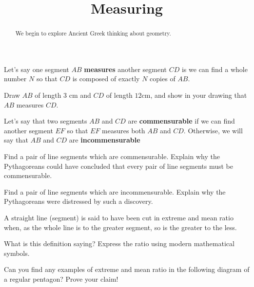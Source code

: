 \documentclass[nooutcomes]{ximera}
\title{Measuring}
\begin{document}
\begin{abstract}
    We begin to explore Ancient Greek thinking about geometry.
\end{abstract}
\maketitle

\begin{definition}
Let's say one segment $AB$ {\bf measures} another segment $CD$ is we can find a whole number $N$ so that $CD$ is composed of exactly $N$ copies of $AB$.
\end{definition}

\begin{problem}
Draw $AB$ of length $3$ cm and $CD$ of length $12$cm, and show in your drawing that $AB$ measures $CD$.
\end{problem}

\begin{definition}
Let's say that two segments $AB$ and $CD$ are {\bf commensurable} if we can find another segment $EF$ so that $EF$ measures both $AB$ and $CD$. Otherwise, we will say that $AB$ and $CD$ are {\bf incommensurable}
\end{definition}


\begin{problem}
Find a pair of line segments which are commensurable. Explain why the Pythagoreans could have concluded that every pair of line segments must be commensurable.
\end{problem}

\begin{problem}
Find a pair of line segments which are incommensurable. Explain why the Pythagoreans were distressed by such a discovery.
\end{problem}

\begin{definition}
A straight line (segment) is said to have been cut in extreme and mean ratio when, as the whole line is to the greater segment, so is the greater to the less.
\end{definition}

\begin{problem}
What is this definition saying? Express the ratio using modern mathematical symbols.
\begin{center}
\end{center}
\end{problem}

\begin{question}
Can you find any examples of extreme and mean ratio in the following diagram of a regular pentagon? Prove your claim!
\end{question}
\end{document}
